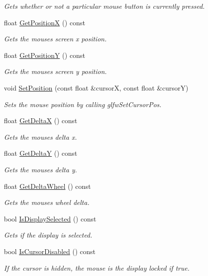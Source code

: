 \begin{DoxyCompactItemize}
\begin{DoxyCompactList}\small\item\em Gets whether or not a particular mouse button is currently pressed. \end{DoxyCompactList}\item 
float \hyperlink{class_flounder_1_1_mouse_aad43f3b799a64366d4c2fef5611baa57}{Get\+PositionX} () const
\begin{DoxyCompactList}\small\item\em Gets the mouses screen x position. \end{DoxyCompactList}\item 
float \hyperlink{class_flounder_1_1_mouse_a84d449542d380977229d3db7ecea8a07}{Get\+PositionY} () const
\begin{DoxyCompactList}\small\item\em Gets the mouses screen y position. \end{DoxyCompactList}\item 
void \hyperlink{class_flounder_1_1_mouse_aefde9c7cd0c04fe03edf838855cb5df2}{Set\+Position} (const float \&cursorX, const float \&cursorY)
\begin{DoxyCompactList}\small\item\em Sets the mouse position by calling glfw\+Set\+Cursor\+Pos. \end{DoxyCompactList}\item 
float \hyperlink{class_flounder_1_1_mouse_a231056bb59781251e989ffd10b64725a}{Get\+DeltaX} () const
\begin{DoxyCompactList}\small\item\em Gets the mouses delta x. \end{DoxyCompactList}\item 
float \hyperlink{class_flounder_1_1_mouse_ab68a3ee8d03be4ef83cecbd83cb6a080}{Get\+DeltaY} () const
\begin{DoxyCompactList}\small\item\em Gets the mouses delta y. \end{DoxyCompactList}\item 
float \hyperlink{class_flounder_1_1_mouse_a3981eb9677ebdc9979da0508bc1787d2}{Get\+Delta\+Wheel} () const
\begin{DoxyCompactList}\small\item\em Gets the mouses wheel delta. \end{DoxyCompactList}\item 
bool \hyperlink{class_flounder_1_1_mouse_ad24ca606782a055db197563e573aec8f}{Is\+Display\+Selected} () const
\begin{DoxyCompactList}\small\item\em Gets if the display is selected. \end{DoxyCompactList}\item 
bool \hyperlink{class_flounder_1_1_mouse_a381401976185ff9dbd46cb5ac9509a59}{Is\+Cursor\+Disabled} () const
\begin{DoxyCompactList}\small\item\em If the cursor is hidden, the mouse is the display locked if true. \end{DoxyCompactList}\end{DoxyCompactItemize}
